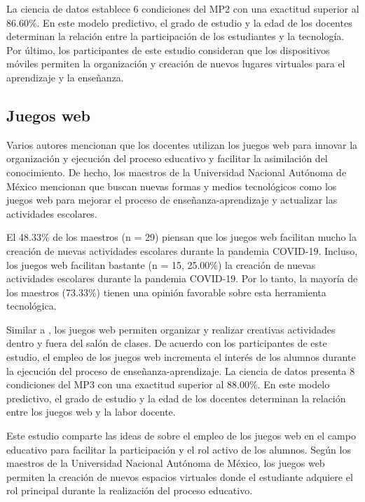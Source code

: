 \documentclass[spanish]{textolivre}
\begin{document}
La ciencia de datos establece 6 condiciones del MP2 con una exactitud superior al 86.60\%. En este modelo predictivo, el grado de estudio y la edad de los docentes determinan la relación entre la participación de los estudiantes y la tecnología.  Por último, los participantes de este estudio consideran que los dispositivos móviles permiten la organización y creación de nuevos lugares virtuales para el aprendizaje y la enseñanza.

\subsection{Juegos web}
Varios autores \cite{donald2017, smith2020, ypsilanti2014} mencionan que los docentes utilizan los juegos web para innovar la organización y ejecución del proceso educativo y facilitar la asimilación del conocimiento. De hecho, los maestros de la Universidad Nacional Autónoma de México mencionan que buscan nuevas formas y medios tecnológicos como los juegos web para mejorar el proceso de enseñanza-aprendizaje y actualizar las actividades escolares.

El 48.33\% de los maestros (n = 29) piensan que los juegos web facilitan mucho la creación de nuevas actividades escolares durante la pandemia COVID-19. Incluso, los juegos web facilitan bastante (n = 15, 25.00\%) la creación de nuevas actividades escolares durante la pandemia COVID-19. Por lo tanto, la mayoría de los maestros (73.33\%) tienen una opinión favorable sobre esta herramienta tecnológica.

Similar a \textcite{de_la_pena_esteban2020}, los juegos web permiten organizar y realizar creativas actividades dentro y fuera del salón de clases. De acuerdo con los participantes de este estudio, el empleo de los juegos web incrementa el interés de los alumnos durante la ejecución del proceso de enseñanza-aprendizaje.
La ciencia de datos presenta 8 condiciones del MP3 con una exactitud superior al 88.00\%. En este modelo predictivo, el grado de estudio y la edad de los docentes determinan la relación entre los juegos web y la labor docente.

Este estudio comparte las ideas de \textcite{donald2017} sobre el empleo de los juegos web en el campo educativo para facilitar la participación y el rol activo de los alumnos. Según los maestros de la Universidad Nacional Autónoma de México, los juegos web permiten la creación de nuevos espacios virtuales donde el estudiante adquiere el rol principal durante la realización del proceso educativo.
\end{document}
